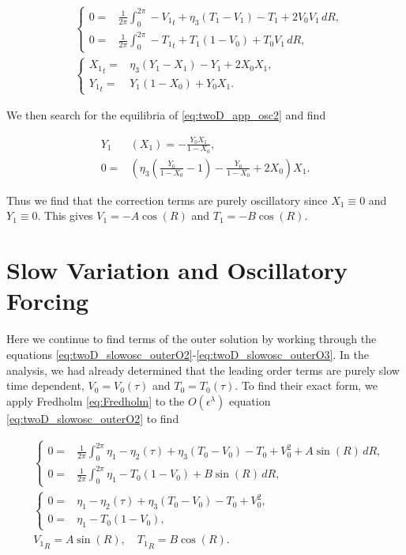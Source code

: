 \begin{equation}\label{eq:twoD_app_osc2}
\begin{aligned}
&\begin{cases}
	0 = & \frac{1}{2\pi}\int_0^{2\pi}-{V_1}_t+\eta_3(T_1-V_1)-T_1+2V_0V_1\,dR,\\
	 0 =& \frac{1}{2\pi}\int_0^{2\pi}-{T_1}_t+ T_1(1-V_0)+T_0V_1\,dR,
\end{cases}\\
&\begin{cases}
	{X_1}_t = & \eta_3(Y_1-X_1)-Y_1+2X_0X_1,\\
	 {Y_1}_t =&  Y_1(1-X_0)+Y_0X_1.
\end{cases}
\end{aligned}
\end{equation}

We then search for the equilibria of \eqref{eq:twoD_app_osc2} and find

\begin{equation*}
\begin{aligned}
Y_1&(X_1) =-\frac{Y_0X_1}{1-X_0},\\
0 =& \left(\eta_3\left(\frac{Y_0}{1-X_0}-1\right)-\frac{Y_0}{1-X_0}+2X_0\right)X_1.
\end{aligned}
\end{equation*}

Thus we find that the correction terms are purely oscillatory since $X_1\equiv 0$ and $Y_1 \equiv 0$. This gives $V_1=-A\cos(R)$ and $T_1=-B\cos(R)$.

\section*{Slow Variation and Oscillatory Forcing}

Here we continue to find terms of the outer solution by working through the equations \eqref{eq:twoD_slowosc_outerO2}-\eqref{eq:twoD_slowosc_outerO3}. In the analysis, we had already determined that the leading order terms are purely slow time dependent, $V_0=V_0(\tau)$ and $T_0=T_0(\tau)$. To find their exact form, we apply Fredholm \eqref{eq:Fredholm} to the $O(\epsilon^\lambda)$ equation \eqref{eq:twoD_slowosc_outerO2} to find 

\begin{equation}\label{eq:twoD_app_slowosc1}
\begin{aligned}
&\begin{cases}
	0 = & \frac{1}{2\pi}\int_0^{2\pi}\eta_1-\eta_2(\tau)+\eta_3(T_0-V_0)-T_0+V_0^2+A\sin(R)\,dR,\\
	 0 =& \frac{1}{2\pi}\int_0^{2\pi} \eta_1-T_0(1-V_0)+B\sin(R)\,dR,
\end{cases}\\
&\begin{cases}
	0 = & \eta_1-\eta_2(\tau)+\eta_3(T_0-V_0)-T_0+V_0^2,\\
	 0 =&  \eta_1-T_0(1-V_0),
\end{cases}\\
& {V_1}_R = A\sin(R),\quad {T_1}_R = B\cos(R).
\end{aligned}
\end{equation}

